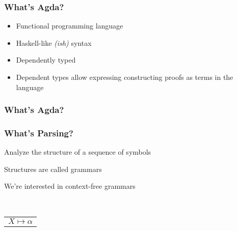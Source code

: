 
\begin{frame}
	\frametitle{What's Agda?}

	\begin{itemize}
		\item Functional programming language
		\item Haskell-like \emph{(ish)} syntax
		\item Dependently typed
		\item Dependent types allow expressing constructing proofs as terms 
			in the language
	\end{itemize}
\end{frame}

\begin{frame}
	\frametitle{What's Agda?}
\end{frame}

\begin{frame}
	\frametitle{What's Parsing?}

	\begin{itemize*}
		\item Analyze the structure of a sequence of symbols
		\item Structures are called grammars
		\item We're interested in context-free grammars
	\end{itemize*}\\
	\vspace{0.5cm}
	\centering
	\begin{tabular}{c}
		$X \mapsto \alpha$ 
	\end{tabular}
	\vspace{2cm}

\end{frame}


